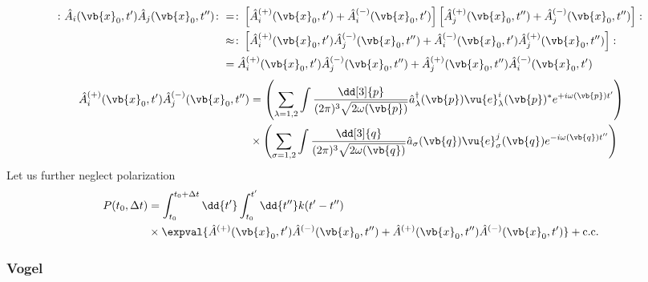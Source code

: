 \begin{equation}
	\begin{split}
		\colon
		\hat{A}_i(\vb{x}_0,t^\prime)
		\hat{A}_j(\vb{x}_0,t^{\prime\prime})
		\colon
		&=
		\colon
		\left[
			\hat{A}_i^{(+)}(\vb{x}_0,t^\prime)
			+
			\hat{A}_i^{(-)}(\vb{x}_0,t^\prime)
		\right]
		\left[
			\hat{A}_j^{(+)}(\vb{x}_0,t^{\prime\prime})
			+
			\hat{A}_j^{(-)}(\vb{x}_0,t^{\prime\prime})
		\right]
		\colon
		\\
		&\approx
		\colon
		\left[
			\hat{A}_i^{(+)}(\vb{x}_0,t^\prime)
			\hat{A}_j^{(-)}(\vb{x}_0,t^{\prime\prime})
			+
			\hat{A}_i^{(-)}(\vb{x}_0,t^\prime)
			\hat{A}_j^{(+)}(\vb{x}_0,t^{\prime\prime})
		\right]
		\colon
		\\
		&=
		\hat{A}_i^{(+)}(\vb{x}_0,t^\prime)
		\hat{A}_j^{(-)}(\vb{x}_0,t^{\prime\prime})
		+
		\hat{A}_j^{(+)}(\vb{x}_0,t^{\prime\prime})
		\hat{A}_i^{(-)}(\vb{x}_0,t^\prime)
	\end{split}
\end{equation}
\begin{equation}
	\begin{split}
		\hat{A}_i^{(+)}(\vb{x}_0,t^\prime)
		\hat{A}_j^{(-)}(\vb{x}_0,t^{\prime\prime})
		&=
		\left(
			\sum_{\lambda=1,2}
			\int\frac{\dd[3]{p}}{(2\pi)^3\sqrt{2\omega(\vb{p})}}
			\hat{a}_\lambda^\dagger(\vb{p})
			\vu{e}^i_\lambda(\vb{p})^*
			e^{+i\omega(\vb{p})t^\prime}
		\right)
		\\
		&\times
		\left(
			\sum_{\sigma=1,2}
			\int\frac{\dd[3]{q}}{(2\pi)^3\sqrt{2\omega(\vb{q})}}
			\hat{a}_\sigma(\vb{q})
			\vu{e}^j_\sigma(\vb{q})
			e^{-i\omega(\vb{q})t^{\prime\prime}}
		\right)
	\end{split}
\end{equation}
Let us further neglect polarization
\begin{equation}
	\begin{split}
		P(t_0,\Delta t)
		&=
		\int_{t_0}^{t_0+\Delta t}\dd{t^\prime}
		\int_{t_0}^{t^\prime}\dd{t^{\prime\prime}}
		k(t^\prime-t^{\prime\prime})
		\\
		&\times
		\expval{
			\hat{A}^{(+)}(\vb{x}_0,t^\prime)
			\hat{A}^{(-)}(\vb{x}_0,t^{\prime\prime})
			+
			\hat{A}^{(+)}(\vb{x}_0,t^{\prime\prime})
			\hat{A}^{(-)}(\vb{x}_0,t^\prime)
		}
		+
		\text{c.c.}
	\end{split}
\end{equation}

\subsubsection{Vogel}

